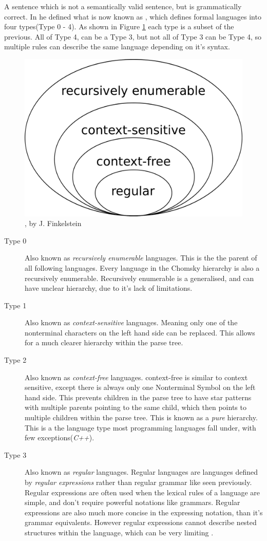 A sentence which is not a semantically valid sentence, but is grammatically correct. In \autocite{Chomsky} he defined what is now known as \emph{\hierarchy{}}, which defines formal languages into four types(Type 0 - 4). As shown in Figure \ref{fig:Chomsky} each type is a subset of the previous. All of Type 4, can be a Type 3, but not all of Type 3 can be Type 4, so multiple rules can describe the same language depending on it's syntax.
\clearpage
\begin{figure}[h]
    \centerline{\includegraphics[width=0.5\linewidth]{img/Chomsky.png}}
    \caption{\hierarchy{}, by J. Finkelstein}
    \label{fig:Chomsky}
\end{figure}
\begin{description}
    
    \item[Type 0] Also known as \emph{recursively enumerable} languages. This is the the parent of all following languages. Every language in the Chomsky hierarchy is also a recursively enumerable. Recursively enumerable is a generalised, and can have unclear hierarchy, due to it's lack of limitations.
    
    \item[Type 1] Also known as \emph{context-sensitive} languages. Meaning only one of the nonterminal characters on the left hand side can be replaced. This allows for a much clearer hierarchy within the parse tree.
    
    \item[Type 2] Also known as \emph{context-free} languages. context-free is similar to context sensitive, except there is always only one Nonterminal Symbol on the left hand side. This prevents children in the parse tree to have star patterns with multiple parents pointing to the same child, which then points to multiple children within the parse tree. This is known as a \emph{pure} hierarchy. This is a the language type most programming languages fall under, with few exceptions(\emph{C++}).

    \item[Type 3]  Also known as \emph{regular} languages. Regular languages are languages defined by \emph{regular expressions} rather than regular grammar like seen previously. Regular expressions are often used when the lexical rules of a language are simple, and don't require powerful notations like grammars. Regular expressions are also much more concise in the expressing notation, than it's grammar equivalents. However regular expressions cannot describe nested structures within the language, which can be very limiting \autocite{DragonBook}.
\end{description}

